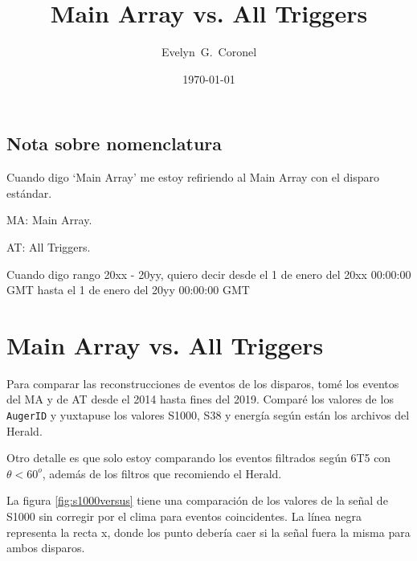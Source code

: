 
\usepackage{scalerel}
\usepackage{physics}



\title{Main Array vs. All Triggers}
\author{Evelyn~G.~Coronel}


\date[]{\lowercase{\today}} %

\maketitle

\subsection*{Nota sobre nomenclatura}
Cuando digo `Main Array' me estoy refiriendo al Main Array con el disparo estándar.

MA: Main Array.

AT: All Triggers.

Cuando digo rango 20xx - 20yy, quiero decir desde el 1 de enero del 20xx 00:00:00 GMT hasta el 1 de enero del 20yy 00:00:00 GMT
\section*{Main Array vs. All Triggers}

Para comparar las reconstrucciones de eventos de los disparos, tomé los eventos del MA y de AT desde el 2014 hasta fines del 2019. Comparé los valores de los \verb|AugerID| y yuxtapuse los valores S1000, S38 y energía según están los archivos del Herald.

Otro detalle es que solo estoy comparando los eventos filtrados según 6T5 con $\theta<60^o$, además de los filtros que recomiendo el Herald.

La figura \ref{fig:s1000versus} tiene una comparación de los valores de la señal de S1000 sin corregir por el clima para eventos coincidentes.  La línea negra representa la recta x, donde los punto debería caer si la señal fuera la misma para ambos disparos.


